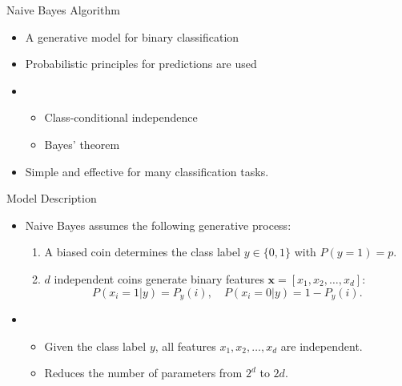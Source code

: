 
\begin{frame}{Naive Bayes Algorithm}
    \begin{itemize}
        \item A generative model for binary classification
        \item Probabilistic principles for predictions are used
        \item []
        \begin{itemize}
            \item Class-conditional independence
            \item Bayes' theorem
        \end{itemize}
        \item Simple and effective for many classification tasks.
    \end{itemize}
\end{frame}

\begin{frame}{Model Description}
    \begin{itemize}
        \item Naive Bayes assumes the following generative process:
        \begin{enumerate}
            \item A biased coin determines the class label $y \in \{0, 1\}$ with $P(y=1) = p$.
            \item $d$ independent coins generate binary features $\mathbf{x} = [x_1, x_2, \dots, x_d]$:
            \[
            P(x_i = 1 | y) = P_y(i), \quad P(x_i = 0 | y) = 1 - P_y(i).
            \]
        \end{enumerate}
        \item []
        \begin{itemize}
            \item Given the class label $y$, all features $x_1, x_2, \dots, x_d$ are independent.
            \item Reduces the number of parameters from $2^d$ to $2d$.
        \end{itemize}
    \end{itemize}
\end{frame}

